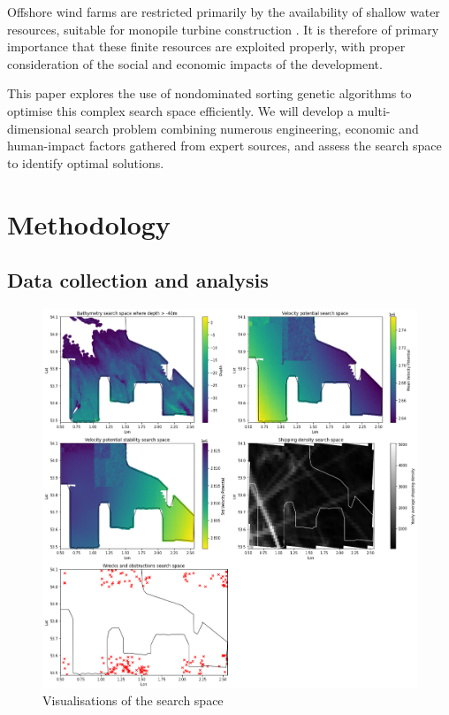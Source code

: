 \documentclass[preprint,12pt]{elsarticle}
\begin{document}
Offshore wind farms are restricted primarily by the availability of shallow water resources, suitable for monopile turbine construction \cite{2019}. It is therefore of primary importance that these finite resources are exploited properly, with proper consideration of the social and economic impacts of the development.

This paper explores the use of nondominated sorting genetic algorithms to optimise this complex search space efficiently. We will develop a multi-dimensional search problem combining numerous engineering, economic and human-impact factors gathered from expert sources, and assess the search space to identify optimal solutions.

\newpage
\section{Methodology}
\subsection{Data collection and analysis}
\begin{figure}[h!]
    \includegraphics[width=\textwidth,height=\textheight,keepaspectratio]{images/search_space_empty.png}
    \caption{Visualisations of the search space}
    \label{fig:search_space_visualisations}
\end{figure}
\end{document}
